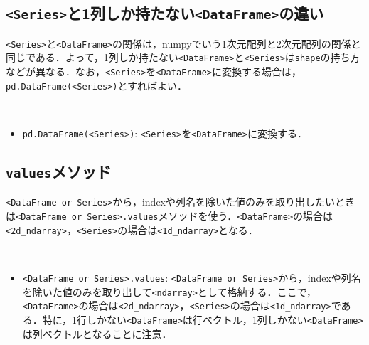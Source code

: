 \subsection{\texttt{<Series>}と1列しか持たない\texttt{<DataFrame>}の違い}
\texttt{<Series>}と\texttt{<DataFrame>}の関係は，numpyでいう1次元配列と2次元配列の関係と同じである．よって，1列しか持たない\texttt{<DataFrame>}と\texttt{<Series>}は\texttt{shape}の持ち方などが異なる．なお，\texttt{<Series>}を\texttt{<DataFrame>}に変換する場合は，\texttt{pd.DataFrame(<Series>)}とすればよい．

\begin{gram}　
\begin{itemize}
\item \texttt{pd.DataFrame(<Series>)}: \texttt{<Series>}を\texttt{<DataFrame>}に変換する．
\end{itemize}
\end{gram}
\begin{cod}[\texttt{pd5.py}]　
}]{code/pd5.py}
\vspace{-10pt}
\begin{lstlisting}
df_sub1=
0    17.5920
1     9.1302
2    13.6620
3    11.8540
4     6.8233
Name: profit, dtype: float64
type=<class 'pandas.core.series.Series'>
shape=(5,)

df_sub2=
   population  profit
2      8.5186  13.662
type=<class 'pandas.core.frame.DataFrame'>
shape=(1, 2)

df_sub3=
    profit
0  17.5920
1   9.1302
2  13.6620
3  11.8540
4   6.8233
type=<class 'pandas.core.frame.DataFrame'>
shape=(5, 1)
\end{lstlisting}
\end{cod}
\vspace{-10pt}

\subsection{\texttt{values}メソッド}
\texttt{<DataFrame or Series>}から，indexや列名を除いた値のみを取り出したいときは\texttt{<DataFrame or Series>.values}メソッドを使う．\texttt{<DataFrame>}の場合は\texttt{<2d\_ndarray>}，\texttt{<Series>}の場合は\texttt{<1d\_ndarray>}となる．

\begin{gram}　
\begin{itemize}
\item \texttt{<DataFrame or Series>.values}: \texttt{<DataFrame or Series>}から，indexや列名を除いた値のみを取り出して\texttt{<ndarray>}として格納する．ここで，\texttt{<DataFrame>}の場合は\texttt{<2d\_ndarray>}，\texttt{<Series>}の場合は\texttt{<1d\_ndarray>}である．特に，1行しかない\texttt{<DataFrame>}は行ベクトル，1列しかない\texttt{<DataFrame>}は列ベクトルとなることに注意．
\end{itemize}
\end{gram}


